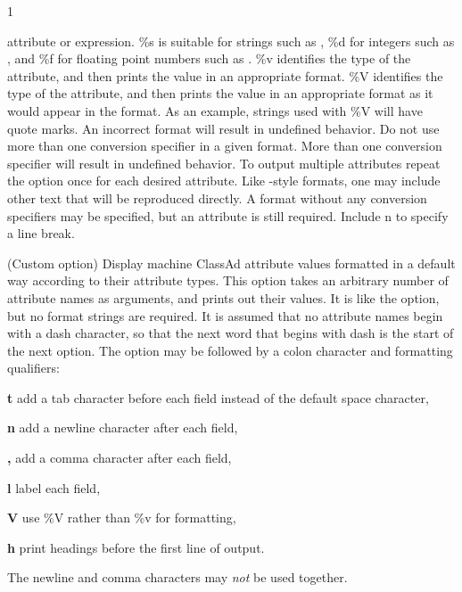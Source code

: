 \begin{ManPage}{\label{man-condor-status}}{1}
\begin{Options}
{      attribute or expression.
      \%s is suitable for strings such as ,
      \%d for integers such as ,
      and \%f for floating point numbers such as .
      \%v identifies the type of the attribute, 
      and then prints the value in an appropriate format.
      \%V identifies the type of the attribute, 
      and then prints the value in an appropriate format as it would
      appear in the  format.
      As an example, strings used with \%V will have quote marks.
      An incorrect format will result in undefined behavior.
      Do not use more than one conversion specifier in a given
      format.  More than one conversion specifier will result
      in undefined behavior.  To output multiple attributes
      repeat the  option once for each desired
      attribute.
      Like -style formats, one may include other
      text that will be reproduced directly.
      A format without any conversion specifiers may be specified,
      but an attribute is still required.
      Include \Bs n to specify a line break. }
     {
      (Custom option) Display machine ClassAd attribute values 
      formatted in a default way according to their attribute types.  
      This option takes an arbitrary number of attribute names as arguments,
      and prints out their values.  It is like the  option,
      but no format strings are required.
      It is assumed that no attribute names begin with a dash character,
      so that the next word that begins with dash is the 
      start of the next option.
      The  option may be followed by a colon character
      and formatting qualifiers:

      \textbf{t} add a tab character before each field instead of 
      the default space character,

      \textbf{n} add a newline character after each field,

      \textbf{,} add a comma character after each field,

      \textbf{l} label each field,

      \textbf{V} use \%V rather than \%v for formatting,

      \textbf{h} print headings before the first line of output.

      The newline and comma characters may \emph{not} be used together.
      }
\end{Options}


\end{ManPage}
